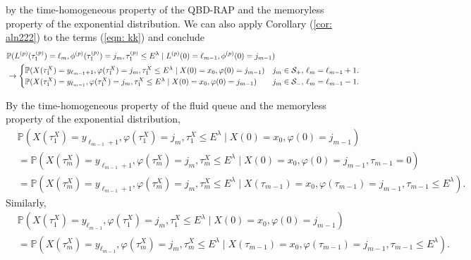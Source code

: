by the time-homogeneous property of the QBD-RAP and the memoryless property of the exponential distribution. We can also apply Corollary (\ref{cor: aln222}) to the terms (\ref{eqn: kk}) and conclude 
\begin{align}
	& \mathbb P(L^{(p)}(\tau_1^{(p)}) = \ell_m, \phi^{(p)}(\tau_1^{(p)}) = j_m, \tau_{1}^{(p)}\leq E^\lambda 
            	 \mid L^{(p)}(0) = \ell_{m-1}, 
	 	 \phi^{(p)}(0) = j_{m-1})\nonumber
	\\&\to \begin{cases}
	 	\mathbb P(X(\tau_1^X) = y_{\ell_{m-1}+1}, \varphi(\tau_1^X) = j_m, \tau_{1}^X\leq E^\lambda 
            	 \mid X(0) = x_0, \varphi(0) = j_{m-1}) & j_m\in\mathcal{S}_+,\, \ell_m=\ell_{m-1}+1.
	 	\\\mathbb P(X(\tau_1^X) = y_{\ell_{m-1}}, \varphi(\tau_1^X) = j_m, \tau_{1}^X\leq E^\lambda 
            	 \mid X(0) = x_0, \varphi(0) = j_{m-1}) & j_m\in\mathcal{S}_-,\, \ell_m=\ell_{m-1}-1.
	 \end{cases} \label{eqn:kknvf fawoprgj v}
\end{align}

By the time-homogeneous property of the fluid queue and the memoryless property of the exponential distribution, 
\begin{align}
	&\mathbb P(X(\tau_1^X) = y_{\ell_{m-1}+1}, \varphi(\tau_1^X) = j_m, \tau_{1}^X\leq E^\lambda 
            	 \mid X(0) = x_0, \varphi(0) = j_{m-1}) \nonumber
	 \\&=\mathbb P(X(\tau_m^X) = y_{\ell_{m-1}+1}, \varphi(\tau_m^X) = j_m, \tau_{m}^X\leq E^\lambda 
            	 \mid X(0) = x_0, \varphi(0) = j_{m-1}, \tau_{m-1}=0)\nonumber 
	 \\&=\mathbb P(X(\tau_m^X) = y_{\ell_{m-1}+1}, \varphi(\tau_m^X) = j_m, \tau_{m}^X\leq E^\lambda 
            	 \mid X(\tau_{m-1}) = x_0, \varphi(\tau_{m-1}) = j_{m-1}, \tau_{m-1}\leq E^{\lambda}).
\end{align}
Similarly, 
\begin{align}
	&\mathbb P(X(\tau_1^X) = y_{\ell_{m-1}}, \varphi(\tau_1^X) = j_m, \tau_{1}^X\leq E^\lambda 
            	 \mid X(0) = x_0, \varphi(0) = j_{m-1}) \nonumber
	 \\&=\mathbb P(X(\tau_m^X) = y_{\ell_{m-1}}, \varphi(\tau_m^X) = j_m, \tau_{m}^X\leq E^\lambda 
            	 \mid X(\tau_{m-1}) = x_0, \varphi(\tau_{m-1}) = j_{m-1}, \tau_{m-1}\leq E^\lambda).
\end{align}

